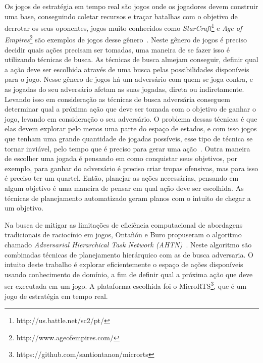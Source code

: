 Os jogos de estratégia em tempo real são jogos onde os jogadores devem construir uma base, conseguindo coletar recursos e traçar batalhas com o objetivo de derrotar os seus oponentes, jogos muito conhecidos como \textit{StarCraft}\footnote{http://us.battle.net/sc2/pt/} e \textit{Age of Empires}\footnote{http://www.ageofempires.com/} são exemplos de jogos desse gênero~\cite{ontanon2013survey}.
Neste gênero de jogos é preciso decidir quais ações precisam ser tomadas, uma maneira de se fazer isso é utilizando técnicas de busca. As técnicas de busca almejam conseguir, definir qual a ação deve ser escolhida através de uma busca pelas possibilidades disponíveis para o jogo. 
Nesse gênero de jogos há um adversário com quem se joga contra, e as jogadas do seu adversário afetam as suas jogadas, direta ou indiretamente. Levando isso em consideração as técnicas de busca adversária conseguem determinar qual a próxima ação que deve ser tomada com o objetivo de ganhar o jogo, levando em consideração o seu adversário. O problema dessas técnicas é que elas devem explorar pelo menos uma parte do espaço de estados, e com isso jogos que tenham uma grande quantidade de jogadas possíveis, esse tipo de técnica se tornar inviável, pelo tempo que é preciso para gerar uma ação~\cite{ontanon2012minimax}.
Outra maneira de escolher uma jogada é pensando em como conquistar seus objetivos, por exemplo, para ganhar do adversário é preciso criar tropas ofensivas, mas para isso é preciso ter um quartel. Então, planejar as ações necessárias, pensando em algum objetivo é uma maneira de pensar em qual ação deve ser escolhida. As técnicas de planejamento automatizado geram planos com o intuito de chegar a um objetivo. 

Na busca de mitigar as limitações de eficiência computacional de abordagens tradicionais de raciocínio em jogos, Ontañón e Buro propuseram o algoritmo chamado \textit{Adversarial Hierarchical Task Network (AHTN)}~\cite{ontanon2015adversarial}. 
Neste algoritmo são combinadas técnicas de planejamento hierárquico com as de busca adversaria. 
O intuito deste trabalho é explorar eficientemente o espaço de ações disponíveis usando conhecimento de domínio, a fim de definir qual a próxima ação que deve ser executada em um jogo. 
A plataforma escolhida foi o MicroRTS\footnote{https://github.com/santiontanon/microrts}, que é um jogo de estratégia em tempo real. 

